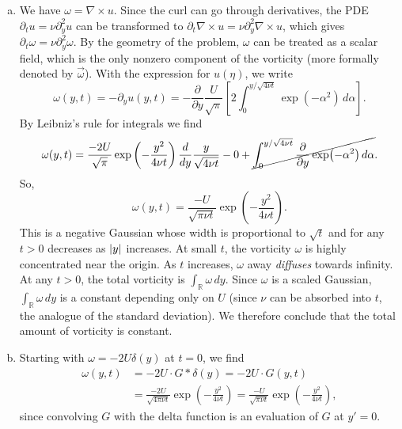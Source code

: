 \documentclass[11pt]{article}
\newcommand{\f}[2]{\frac{#1}{#2}}
\newcommand{\p}{\partial}%
\begin{document}
\begin{enumerate}[(a)]
	
	\item We have $\omega = \nabla \times u$. Since the curl can go through derivatives, the PDE $\p_t u = \nu \p_y^2 u$ can be transformed to $\p_t \nabla \times u = \nu \p_y^2 \nabla \times u$, which gives $\p_t \omega = \nu \p_y^2 \omega$. By the geometry of the problem, $\omega$ can be treated as a scalar field, which is the only nonzero component of the vorticity (more formally denoted by $\vec{\omega}$). With the expression for $u(\eta)$, we write
	\begin{equation*}
	\omega(y,t) = -\p_y u(y,t) = -\f{\p}{\p y}  \f{U}{\sqrt{\pi}}\left[ 2\int_0^{y/\sqrt{4\nu t}} \exp(-\alpha^2)\,d\alpha \right].
	\end{equation*}
	By Leibniz's rule for integrals we find 
	\begin{equation*}
	\omega(y,t) = \f{-2U}{\sqrt{\pi}} \exp\left(- \f{y^2}{{4\nu t}}  \right) \f{d}{dy} \f{y}{\sqrt{4\nu t}}  - 0 + \cancel{\int^{y/\sqrt{4\nu t}}_0 \f{\p}{\p y} \exp(-\alpha^2)\,d\alpha}.
	\end{equation*}
	So, 
	\begin{equation*}
	\omega(y,t) = \f{-U}{\sqrt{\pi \nu t}}\exp\left(
	- \f{y^2}{{4\nu t}}\right).
	\end{equation*}
	This is a negative Gaussian whose width is proportional to $\sqrt{t}$ and for any  $t>0$ decreases as $\abs{y}$ increases. At small $t$, the vorticity $\omega$ is highly concentrated near the origin. As $t$ increases, $\omega$ away \textit{diffuses} towards infinity. At any $t>0$, the total vorticity is $\int_{\mathbb{R}} \omega\,dy$. Since $\omega$ is a scaled Gaussian, $\int_{\mathbb{R}} \omega\,dy$ is a constant depending only on $U$ (since $\nu$ can be absorbed into $t$, the analogue of the standard deviation). We therefore conclude that the total amount of vorticity is constant.   
	
	
	\item Starting with $\omega = -2U \delta(y)$ at $t=0$, we find 
	\begin{align*}
	\omega(y,t) &=  -2U \cdot G\ast\delta(y) =  -2U\cdot  G(y,t) \\
	&= \f{-2U}{\sqrt{4\pi \nu t}}\exp\left( -\f{y^2}{4\nu t} \right) = \f{-U}{\sqrt{\pi \nu t}}\exp\left(
	- \f{y^2}{{4\nu t}}\right),
	\end{align*}
	since convolving $G$ with the delta function is an evaluation of $G$ at $y'=0$. 
\end{enumerate}
\end{document}
